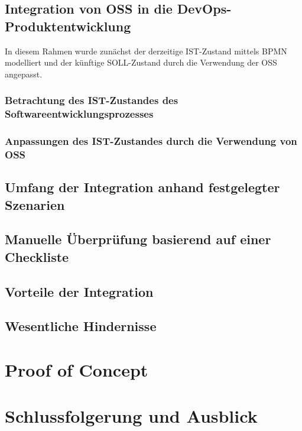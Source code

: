 \documentclass[12pt,titlepage]{article}
\begin{document}
\subsection{Integration von OSS in die DevOps-Produktentwicklung}
In diesem Rahmen wurde zunächst der derzeitige IST-Zustand mittels BPMN modelliert und der künftige SOLL-Zustand durch die Verwendung der OSS angepasst.

\subsubsection{Betrachtung des IST-Zustandes des Softwareentwicklungsprozesses}


\subsubsection{Anpassungen des IST-Zustandes durch die Verwendung von OSS}


\subsection{Umfang der Integration anhand festgelegter Szenarien}


\subsection{Manuelle Überprüfung basierend auf einer Checkliste}


\subsection{Vorteile der Integration}


\subsection{Wesentliche Hindernisse}



\section{Proof of Concept}




\section{Schlussfolgerung und Ausblick}






\newpage


\end{document}
